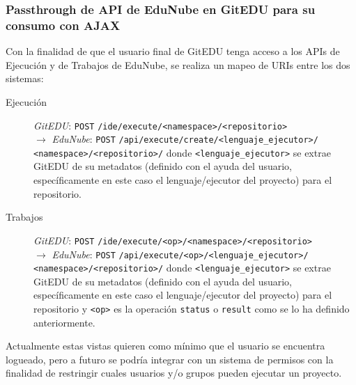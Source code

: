 \subsubsection{Passthrough de API de EduNube en GitEDU para su consumo con AJAX}
Con la finalidad de que el usuario final de GitEDU tenga acceso a los APIs de Ejecución y de Trabajos de EduNube, se realiza un mapeo de URIs entre los dos sistemas:
\begin{description}
	\item[Ejecución] \textit{GitEDU}: \texttt{POST} \texttt{/ide/execute/<namespace>/<repositorio>} \\
    $\rightarrow$ \textit{EduNube}: \texttt{POST} \texttt{/api/execute/create/<lenguaje\_ejecutor>/} \\
    \texttt{<namespace>/<repositorio>/} donde \texttt{<lenguaje\_ejecutor>} se extrae GitEDU de su metadatos (definido con el ayuda del usuario, específicamente en este caso el lenguaje/ejecutor del proyecto) para el repositorio.
    \item[Trabajos] \textit{GitEDU}: \texttt{POST} \texttt{/ide/execute/<op>/<namespace>/<repositorio>} \\
    $\rightarrow$ \textit{EduNube}: \texttt{POST} \texttt{/api/execute/<op>/<lenguaje\_ejecutor>/} \\
    \texttt{<namespace>/<repositorio>/} donde \texttt{<lenguaje\_ejecutor>} se extrae GitEDU de su metadatos (definido con el ayuda del usuario, específicamente en este caso el lenguaje/ejecutor del proyecto) para el repositorio y \texttt{<op>} es la operación \texttt{status} o \texttt{result} como se lo ha definido anteriormente.
\end{description}
Actualmente estas vistas quieren como mínimo que el usuario se encuentra logueado, pero a futuro se podría integrar con un sistema de permisos con la finalidad de restringir cuales usuarios y/o grupos pueden ejecutar un proyecto.

